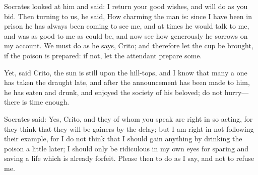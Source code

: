 \documentclass[11pt,letter]{article}
\begin{document}
\par  Socrates looked at him and said: I return your good wishes, and will do as you bid. Then turning to us, he said, How charming the man is: since I have been in prison he has always been coming to see me, and at times he would talk to me, and was as good to me as could be, and now see how generously he sorrows on my account. We must do as he says, Crito; and therefore let the cup be brought, if the poison is prepared: if not, let the attendant prepare some.

\par  Yet, said Crito, the sun is still upon the hill-tops, and I know that many a one has taken the draught late, and after the announcement has been made to him, he has eaten and drunk, and enjoyed the society of his beloved; do not hurry—there is time enough.

\par  Socrates said: Yes, Crito, and they of whom you speak are right in so acting, for they think that they will be gainers by the delay; but I am right in not following their example, for I do not think that I should gain anything by drinking the poison a little later; I should only be ridiculous in my own eyes for sparing and saving a life which is already forfeit. Please then to do as I say, and not to refuse me.
\end{document}
